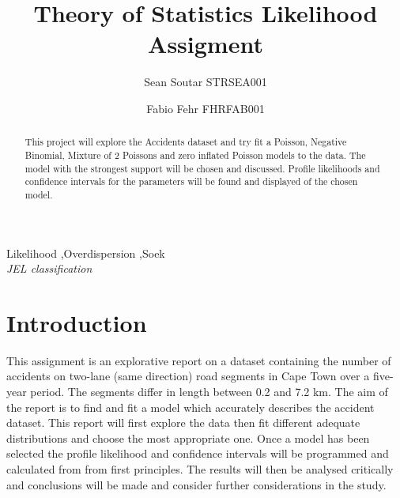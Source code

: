 \documentclass[11pt,preprint, authoryear]{elsarticle}
\numberwithin{equation}{section}
\numberwithin{figure}{section}
\numberwithin{table}{section}
\begin{document}
\begin{frontmatter}  %

\title{Theory of Statistics Likelihood Assigment}

\author[Add1]{Sean Soutar STRSEA001}

\author[Add2]{Fabio Fehr FHRFAB001}




\address[Add1]{UCT Statistics Honours, Cape Town, South Africa}
\address[Add2]{UCT Statistics Honours, Cape Town, South Africa}


\begin{abstract}
\small{
This project will explore the Accidents dataset and try fit a Poisson,
Negative Binomial, Mixture of 2 Poissons and zero inflated Poisson
models to the data. The model with the strongest support will be chosen
and discussed. Profile likelihoods and confidence intervals for the
parameters will be found and displayed of the chosen model.
}
\end{abstract}

\vspace{1cm}

\begin{keyword}
\footnotesize{
Likelihood \sep Overdispersion \sep Soek \\ \vspace{0.3cm}
\textit{JEL classification} 
}
\end{keyword}
\vspace{0.5cm}
\end{frontmatter}



\pagestyle{fancy}
\chead{}
\rhead{}
\lfoot{}
\lhead{}
\cfoot{}


\headsep 35pt %




\section{Introduction}\label{introduction}

This assignment is an explorative report on a dataset containing the
number of accidents on two-lane (same direction) road segments in Cape
Town over a five-year period. The segments differ in length between 0.2
and 7.2 km. The aim of the report is to find and fit a model which
accurately describes the accident dataset. This report will first
explore the data then fit different adequate distributions and choose
the most appropriate one. Once a model has been selected the profile
likelihood and confidence intervals will be programmed and calculated
from from first principles. The results will then be analysed critically
and conclusions will be made and consider further considerations in the
study.
\end{document}
